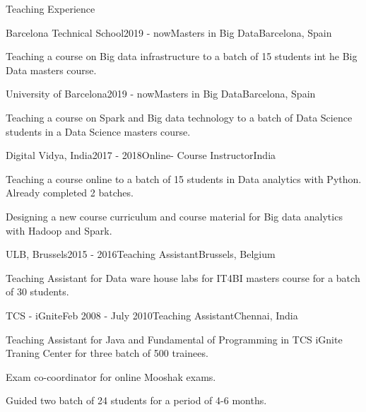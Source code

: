 \documentclass{resume} %
\begin{document}
\begin{rSection}{Teaching Experience}
\begin{rSubsection}{Barcelona Technical School}{2019 - now}{Masters in Big Data}{Barcelona, Spain}
\item Teaching a course on Big data infrastructure to a batch of 15 students int he Big Data masters course.
\end{rSubsection}
\begin{rSubsection}{University of Barcelona}{2019 - now}{Masters in Big Data}{Barcelona, Spain}
\item Teaching a course on Spark and Big data technology to a batch of Data Science students in a Data Science masters course.
\end{rSubsection}
\begin{rSubsection}{Digital Vidya, India}{2017 - 2018}{Online- Course Instructor}{India}
\item Teaching a course online to a batch of 15 students in Data analytics with Python. Already completed 2 batches.
\item Designing a new course curriculum and course material for Big data analytics with Hadoop and Spark.
\end{rSubsection}
\begin{rSubsection}{ULB, Brussels}{2015 - 2016}{Teaching Assistant}{Brussels, Belgium}
\item Teaching Assistant for Data ware house labs for IT4BI masters course for a batch of 30 students.
\end{rSubsection}
\begin{rSubsection}{TCS - iGnite}{Feb 2008 - July 2010}{Teaching Assistant}{Chennai, India}
\item Teaching Assistant for Java and Fundamental of Programming in TCS iGnite Traning Center for three batch of 500 trainees.
\item Exam co-coordinator for online Mooshak exams.
\item Guided two batch of 24 students for a period of 4-6 months.
\end{rSubsection}

\end{rSection}



\end{document}
